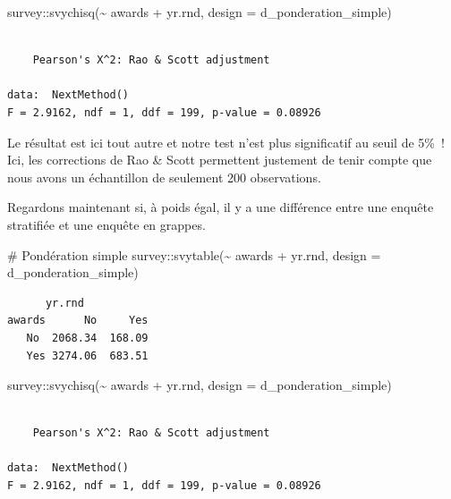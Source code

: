 \documentclass[
  letterpaper,
  DIV=11,
  numbers=noendperiod,
  oneside]{scrreprt}
\newenvironment{Shaded}{\begin{snugshade}}{\end{snugshade}}
\newcommand{\AttributeTok}[1]{\textcolor[rgb]{0.40,0.45,0.13}{#1}}
\newcommand{\CommentTok}[1]{\textcolor[rgb]{0.37,0.37,0.37}{#1}}
\newcommand{\FunctionTok}[1]{\textcolor[rgb]{0.28,0.35,0.67}{#1}}
\newcommand{\NormalTok}[1]{\textcolor[rgb]{0.00,0.23,0.31}{#1}}
\newcommand{\SpecialCharTok}[1]{\textcolor[rgb]{0.37,0.37,0.37}{#1}}
\begin{document}
\begin{Shaded}
\begin{Highlighting}[]
\NormalTok{survey}\SpecialCharTok{::}\FunctionTok{svychisq}\NormalTok{(}\SpecialCharTok{\textasciitilde{}}\NormalTok{ awards }\SpecialCharTok{+}\NormalTok{ yr.rnd, }\AttributeTok{design =}\NormalTok{ d\_ponderation\_simple)}
\end{Highlighting}
\end{Shaded}

\begin{verbatim}

    Pearson's X^2: Rao & Scott adjustment

data:  NextMethod()
F = 2.9162, ndf = 1, ddf = 199, p-value = 0.08926
\end{verbatim}

Le résultat est ici tout autre et notre test n'est plus significatif au
seuil de 5\%~! Ici, les corrections de Rao \& Scott permettent justement
de tenir compte que nous avons un échantillon de seulement 200
observations.

Regardons maintenant si, à poids égal, il y a une différence entre une
enquête stratifiée et une enquête en grappes.

\begin{Shaded}
\begin{Highlighting}[]
\CommentTok{\# Pondération simple}
\NormalTok{survey}\SpecialCharTok{::}\FunctionTok{svytable}\NormalTok{(}\SpecialCharTok{\textasciitilde{}}\NormalTok{ awards }\SpecialCharTok{+}\NormalTok{ yr.rnd, }\AttributeTok{design =}\NormalTok{ d\_ponderation\_simple)}
\end{Highlighting}
\end{Shaded}

\begin{verbatim}
      yr.rnd
awards      No     Yes
   No  2068.34  168.09
   Yes 3274.06  683.51
\end{verbatim}

\begin{Shaded}
\begin{Highlighting}[]
\NormalTok{survey}\SpecialCharTok{::}\FunctionTok{svychisq}\NormalTok{(}\SpecialCharTok{\textasciitilde{}}\NormalTok{ awards }\SpecialCharTok{+}\NormalTok{ yr.rnd, }\AttributeTok{design =}\NormalTok{ d\_ponderation\_simple)}
\end{Highlighting}
\end{Shaded}

\begin{verbatim}

    Pearson's X^2: Rao & Scott adjustment

data:  NextMethod()
F = 2.9162, ndf = 1, ddf = 199, p-value = 0.08926
\end{verbatim}
\end{document}

